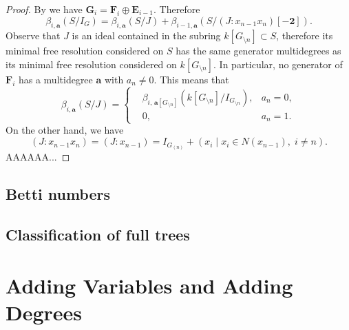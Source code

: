 \documentclass[dvipsnames,10pt]{article}
\begin{document}
\begin{proof}
    By  we have $\mathbf{G}_i=\mathbf{F}_i\oplus \mathbf{E}_{i-1}$. Therefore
    \begin{equation*}
        \beta_{i,\mathbf{a}}(S/I_G) = \beta_{i,\mathbf{a}}(S/J) + \beta_{i-1,\mathbf{a}}(S/(J:x_{n-1}x_n)[-\mathbf{2}]).
    \end{equation*}
    Observe that $J$ is an ideal contained in the subring $k[G_{\setminus n}]\subset S$, therefore its minimal free resolution considered on $S$ has the same generator multidegrees as its minimal free resolution considered on $k[G_{\setminus n}]$. In particular, no generator of $\mathbf{F}_i$ has a multidegree $\mathbf{a}$ with $a_n\neq 0$. This means that
    \begin{equation*}
        \beta_{i,\mathbf{a}}(S/J) = \left\{
            \begin{aligned}
                &\beta_{i,\,\mathbf{a}[G_{\setminus n}]}(k[G_{\setminus n}]/I_{G_{\setminus n}}), &a_n=0,\\
                &0, &a_n=1.
            \end{aligned}
        \right.
    \end{equation*}
    On the other hand, we have
    \begin{equation*}
        (J:x_{n-1}x_n) = (J:x_{n-1}) = I_{G_{(n)}} + (x_i\mid x_i\in N(x_{n-1}),\;i\neq n).
    \end{equation*}
    AAAAAA...
\end{proof}

\subsection{Betti numbers}

\subsection{Classification of full trees}



\section{Adding Variables and Adding Degrees}
\end{document}
